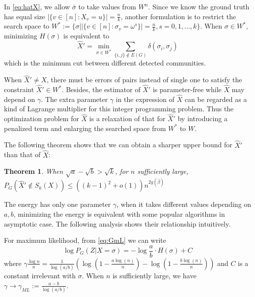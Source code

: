 \documentclass[journal]{IEEEtran}
\newtheorem{theorem}{Theorem}
\newcommand{\A}{\frac{a \log(n)}{n}}
\newcommand{\B}{\frac{b \log(n)}{n}}
\newcommand{\1}{\mathbbm{1}}
\begin{document}
In \eqref{eq:hatX}, we allow $\bar{\sigma}$ to take values from $W^n$. Since we know the ground truth has equal
size $|\{v \in [n] : X_v = u\}| = \frac{n}{k}$, another formulation is to restrict the search space to
$W^*:= \{\sigma \big\vert |\{v \in [n] : \sigma_v = \omega^s\}| = \frac{n}{k}, s=0,1, \dots, k \}$.
When $\sigma \in W^*$, minimizing $H(\sigma)$ is equivalent to
\begin{equation}
\hat{X}' = \min_{\sigma \in W^*} \sum_{\{i,j\} \not\in E(G) } \delta(\sigma_i, \sigma_j)
\end{equation}
which is the minimum cut between different detected communities.

When $\hat{X}' \neq X$, there must be errors of pairs instead of single one to satisfy the constraint $\hat{X}' \in W^*$.
Besides, the estimator of $\hat{X}'$ is parameter-free while $\hat{X}$ may depend on $\gamma$. The extra parameter $\gamma$ in the expression of
$\hat{X}$ can be regarded as a kind of Lagrange multiplier for this integer programming problem. Thus the optimization problem for $\hat{X}$
is a relaxation of that for $\hat{X}'$ by introducing a penalized term and enlarging the searched space from $W^*$ to $W$.

The following theorem shows that we can obtain a sharper upper bound for $\hat{X}'$ than that of $\hat{X}$:
\begin{theorem}\label{thm:error_rate_2}
	When $\sqrt{a} - \sqrt{b} > \sqrt{k}$, for $n$ sufficiently large, $P_G(\hat{X}' \not\in S_k(X)) \leq ((k-1)^2+o(1))n^{2g(\bar{\beta})}$
\end{theorem}
 
The energy has only one parameter $\gamma$, when it takes different values depending on $a,b$, minimizing the
energy is equivalent with some popular algorithms in asymptotic case. The following analysis shows
their relationship intuitively.

For maximum likelihood, from \eqref{eq:GmL} we can write
$$
\log P_G(Z|X=\sigma) = -\log\frac{a}{b} \cdot H(\sigma) + C
$$
where $\gamma \frac{\log n}{n} = \frac{1}{\log(a/b)}(\log (1-\A) - \log (1-\B))$ and $C$ is a constant irrelevant with $\sigma$.
When $n$ is sufficiently large, we have $\gamma \to \gamma_{ML} := \frac{a-b}{\log(a/b)}$.
\end{document}

